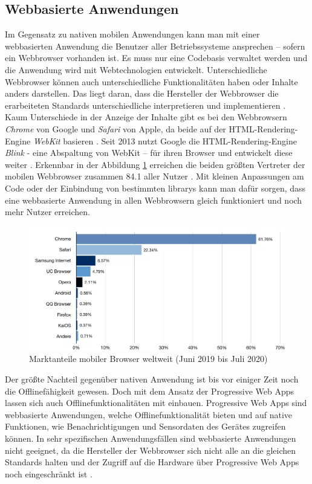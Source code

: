 \subsection{Webbasierte Anwendungen}
Im Gegensatz zu nativen mobilen Anwendungen kann man mit einer webbasierten Anwendung die Benutzer aller Betriebssysteme ansprechen – sofern ein Webbrowser vorhanden ist.
Es muss nur eine Codebasis verwaltet werden und die Anwendung wird mit Webtechnologien entwickelt.
Unterschiedliche Webbrowser können auch unterschiedliche Funktionalitäten haben oder Inhalte anders darstellen.
Das liegt daran, dass die Hersteller der Webbrowser die erarbeiteten Standards unterschiedliche interpretieren und implementieren \parencite{RED2016}.
Kaum Unterschiede in der Anzeige der Inhalte gibt es bei den Webbrowsern \textit{Chrome} von Google und \textit{Safari} von Apple, da beide auf der HTML-Rendering-Engine \textit{WebKit} basieren \parencite{PIC2008}. Seit 2013 nutzt Google die HTML-Rendering-Engine \textit{Blink} - eine Abspaltung von WebKit – für ihren Browser und entwickelt diese weiter \parencite{BAR2013}. Erkennbar in der Abbildung \ref{fig:browser-market-share} erreichen die beiden größten Vertreter der mobilen Webbrowser zusammen \SI{84.1}{\prc} aller Nutzer \parencite{STA2020}.
Mit kleinen Anpassungen am Code oder der Einbindung von bestimmten \Glspl{library} kann man dafür sorgen, dass eine webbasierte Anwendung in allen Webbrowsern gleich funktioniert und noch mehr Nutzer erreichen.
\begin{figure}[h!]
	\includegraphics[scale=0.65]{images/browser-market-share}
	\caption{Marktanteile mobiler Browser weltweit (Juni 2019 bis Juli 2020)}
	\label{fig:browser-market-share}
\end{figure}
Der größte Nachteil gegenüber nativen Anwendung ist bis vor einiger Zeit noch die Offlinefähigkeit gewesen. Doch mit dem Ansatz der Progressive Web Apps lassen sich auch Offlinefunktionalitäten mit einbauen. Progressive Web Apps sind webbasierte Anwendungen, welche Offlinefunktionalität bieten und auf native Funktionen, wie Benachrichtigungen und Sensordaten des Gerätes zugreifen können. In sehr spezifischen Anwendungsfällen sind webbasierte Anwendungen nicht geeignet, da die Hersteller der Webbrowser sich nicht alle an die gleichen Standards halten und der Zugriff auf die Hardware über Progressive Web Apps noch eingeschränkt ist \parencite{TOR2020}.

